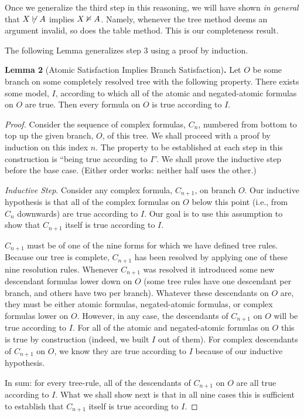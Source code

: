 \documentclass[options]{philosophersimprint}
\begin{document}
Once we generalize the third step in this reasoning, we will have shown \textit{in general} that $X \not\vdash A$ implies $X \nvDash A$. Namely, whenever the tree method deems an argument invalid, so does the table method. This is our completeness result.

The following Lemma generalizes step 3 using a proof by induction.

\textbf{Lemma 2} (Atomic Satisfaction Implies Branch Satisfaction)\textbf{.} Let $O$ be some branch on some completely resolved tree with the following property. There exists some model, $I$, according to which all of the atomic and negated-atomic formulas on $O$ are true. Then every formula on $O$ is true according to $I$.
\begin{proof}
Consider the sequence of complex formulas, $C_n$, numbered from bottom to top up the given branch, $O$, of this tree. We shall proceed with a proof by induction on this index $n$. The property to be established at each step in this construction is ``being true according to $I$''. We shall prove the inductive step before the base case. (Either order works: neither half uses the other.)

\textit{Inductive Step}. Consider any complex formula, $C_{n+1}$, on branch $O$. Our inductive hypothesis is that all of the complex formulas on $O$ below this point (i.e., from $C_n$ downwards) are true according to $I$. Our goal is to use this assumption to show that $C_{n+1}$ itself is true according to $I$.

$C_{n+1}$ must be of one of the nine forms for which we have defined tree rules. Because our tree is complete, $C_{n+1}$ has been resolved by applying one of these nine resolution rules. Whenever $C_{n+1}$ was resolved it introduced some new descendant formulas lower down on $O$ (some tree rules have one descendant per branch, and others have two per branch). Whatever these descendants on $O$ are, they must be either atomic formulas, negated-atomic formulas, or complex formulas lower on $O$. However, in any case, the descendants of $C_{n+1}$ on $O$ will be true according to $I$. For all of the atomic and negated-atomic formulas on $O$ this is true by construction (indeed, we built $I$ out of them). For complex descendants of $C_{n+1}$ on $O$, we know they are true according to $I$ because of our inductive hypothesis.

In sum: for every tree-rule, all of the descendants of $C_{n+1}$ on $O$ are all true according to $I$. What we shall show next is that in all nine cases this is sufficient to establish that $C_{n+1}$ itself is true according to $I$.


\end{proof}
\end{document}
